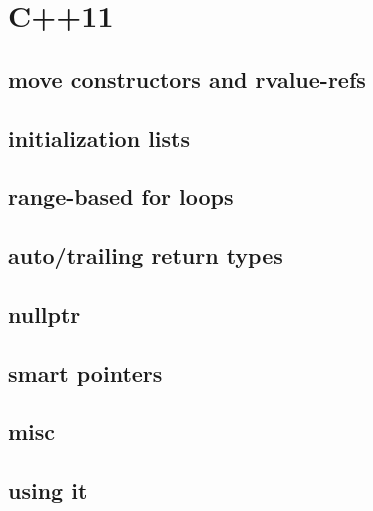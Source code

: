 

\section{C++11}



\subsection{move constructors and rvalue-refs}



\subsection{initialization lists}



\subsection{range-based for loops}



\subsection{auto/trailing return types}





\subsection{nullptr}



\subsection{smart pointers}



\subsection{misc}



\subsection{using it}


